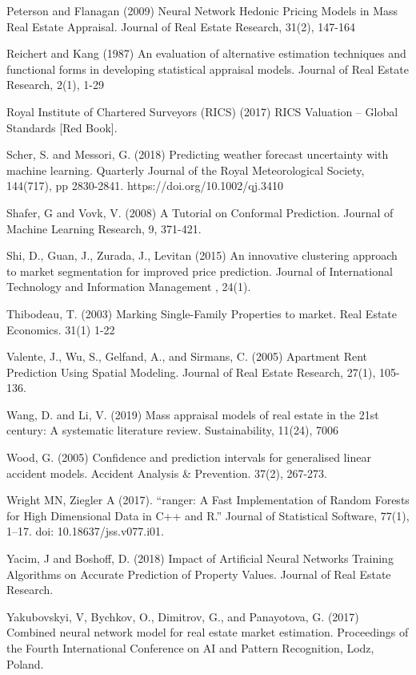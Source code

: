 \documentclass[colTwo]{format}
\theoremstyle{definition}
\begin{document}
\begin{thebibliography}{50}
\harvarditem{}{}{}Peterson and Flanagan (2009) Neural Network Hedonic Pricing Models in Mass Real Estate Appraisal. Journal of Real Estate Research,  31(2), 147-164

\harvarditem{}{}{}Reichert and Kang (1987) An evaluation of alternative estimation techniques and functional forms in developing statistical appraisal models. Journal of Real Estate Research, 2(1), 1-29

\harvarditem{}{}{}Royal Institute of Chartered Surveyors (RICS) (2017) RICS Valuation – Global Standards [Red Book]. 

\harvarditem{}{}{}Scher, S. and Messori, G. (2018) Predicting weather forecast uncertainty with machine learning. Quarterly Journal of the Royal Meteorological Society, 144(717), pp 2830-2841.  https://doi.org/10.1002/qj.3410

\harvarditem{}{}{}Shafer, G and Vovk, V. (2008) A Tutorial on Conformal Prediction. Journal of Machine Learning Research, 9, 371-421. 

\harvarditem{}{}{}Shi, D., Guan, J., Zurada, J., Levitan (2015) An innovative clustering approach to market segmentation for improved price prediction. Journal of International Technology and Information Management , 24(1).  

\harvarditem{}{}{}Thibodeau, T. (2003) Marking Single-Family Properties to market. Real Estate Economics. 31(1) 1-22

\harvarditem{}{}{}Valente, J., Wu, S., Gelfand, A., and Sirmans, C. (2005) Apartment Rent Prediction Using Spatial Modeling. Journal of Real Estate Research, 27(1), 105-136. 

\harvarditem{}{}{}Wang, D. and Li, V. (2019) Mass appraisal models of real estate in the 21st century: A systematic literature review.  Sustainability, 11(24), 7006

\harvarditem{}{}{}Wood, G. (2005) Confidence and prediction intervals for generalised linear accident models. Accident Analysis \& Prevention. 37(2), 267-273. 

\harvarditem{}{}{}Wright MN, Ziegler A (2017). “ranger: A Fast Implementation of Random Forests for High Dimensional Data in C++ and R.” Journal of Statistical Software, 77(1), 1–17. doi: 10.18637/jss.v077.i01.

\harvarditem{}{}{}Yacim, J and Boshoff, D. (2018) Impact of Artificial Neural Networks Training Algorithms on Accurate Prediction of Property Values. Journal of Real Estate Research. 

\harvarditem{}{}{}Yakubovskyi, V, Bychkov, O., Dimitrov, G., and Panayotova, G.  (2017) Combined neural network model for real estate market estimation. Proceedings of the Fourth International Conference on AI and Pattern Recognition, Lodz, Poland.  


\end{thebibliography}
\end{document}
